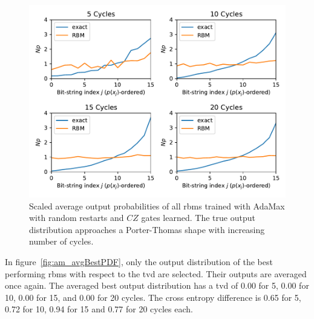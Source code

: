 \begin{figure}[H]
  \centering
  \includegraphics[width=\textwidth]{figures/results/AM-restarts-learned/avgPDF.pdf}
  \caption[Scaled Average Output Probabilities of All RBMs Trained with AdaMax with Random Restarts and $CZ$ Gates Learned]{
    Scaled average output probabilities of all \gls{rbm}s trained with AdaMax with random restarts and $CZ$ gates learned. The true 
    output distribution approaches a Porter-Thomas shape with increasing number of cycles.}
  \label{fig:am_avgPDF}
\end{figure}

In figure~\ref{fig:am_avgBestPDF}, only the output distribution of the best performing \gls{rbm}s with respect to the 
\gls{tvd} are selected. Their outputs are averaged once again. The averaged best output distribution 
has a \gls{tvd} of 0.00 for 5, 0.00 for 10, 0.00 for 15, and 0.00 for 20 
cycles. The cross entropy difference is 0.65 for 5, 0.72 for 10, 0.94 for 15 and 0.77 for 20 cycles each. 

